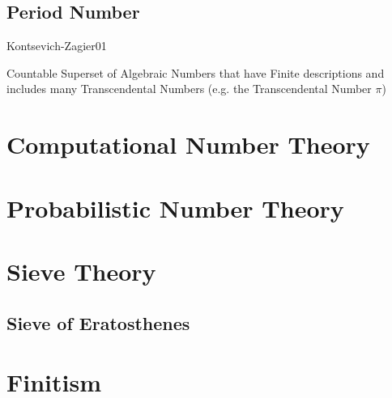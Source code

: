 \subsection{Period Number}\label{sec:period_number}

Kontsevich-Zagier01

Countable Superset of Algebraic Numbers that have Finite descriptions
and includes many Transcendental Numbers (e.g. the Transcendental
Number $\pi$)



\section{Computational Number Theory}\label{sec:computational_number_theory}

\section{Probabilistic Number Theory}\label{sec:probabilistic_number_theory}

\section{Sieve Theory}\label{sec:sieve_theory}

\subsection{Sieve of Eratosthenes}\label{sec:sieve}



\section{Finitism}\label{sec:finitism}

